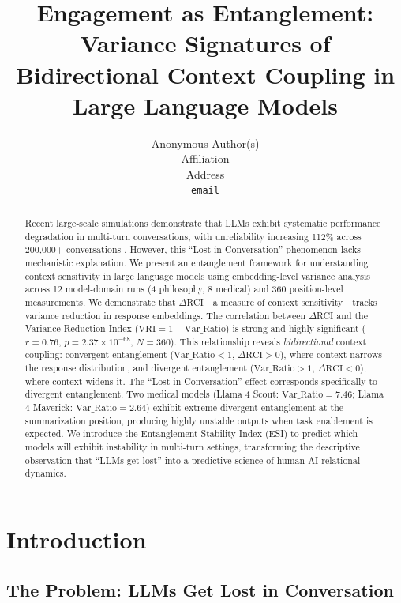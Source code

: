 \documentclass[11pt]{article}
\title{Engagement as Entanglement: Variance Signatures of Bidirectional Context Coupling in Large Language Models}
\author{\name Anonymous Author(s) \\
\addr Affiliation \\
\addr Address \\
\addr \texttt{email}
}
\begin{document}
\maketitle

\begin{abstract}
Recent large-scale simulations demonstrate that LLMs exhibit systematic performance degradation in multi-turn conversations, with unreliability increasing 112\% across 200,000+ conversations \citep{laban2025lost}. However, this ``Lost in Conversation'' phenomenon lacks mechanistic explanation. We present an entanglement framework for understanding context sensitivity in large language models using embedding-level variance analysis across 12 model-domain runs (4 philosophy, 8 medical) and 360 position-level measurements. We demonstrate that $\Delta$RCI---a measure of context sensitivity---tracks variance reduction in response embeddings. The correlation between $\Delta$RCI and the Variance Reduction Index ($\text{VRI} = 1 - \text{Var\_Ratio}$) is strong and highly significant ($r = 0.76$, $p = 2.37 \times 10^{-68}$, $N = 360$). This relationship reveals \emph{bidirectional} context coupling: convergent entanglement ($\text{Var\_Ratio} < 1$, $\Delta\text{RCI} > 0$), where context narrows the response distribution, and divergent entanglement ($\text{Var\_Ratio} > 1$, $\Delta\text{RCI} < 0$), where context widens it. The ``Lost in Conversation'' effect corresponds specifically to divergent entanglement. Two medical models (Llama 4 Scout: $\text{Var\_Ratio} = 7.46$; Llama 4 Maverick: $\text{Var\_Ratio} = 2.64$) exhibit extreme divergent entanglement at the summarization position, producing highly unstable outputs when task enablement is expected. We introduce the Entanglement Stability Index (ESI) to predict which models will exhibit instability in multi-turn settings, transforming the descriptive observation that ``LLMs get lost'' into a predictive science of human-AI relational dynamics.
\end{abstract}

\section{Introduction}

\subsection{The Problem: LLMs Get Lost in Conversation}
\end{document}
